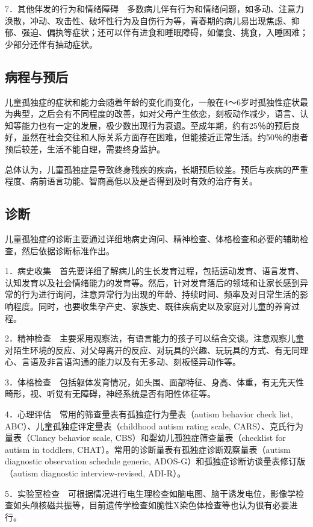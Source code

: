 7．其他伴发的行为和情绪障碍　多数病儿伴有行为和情绪问题，如多动、注意力涣散，冲动、攻击性、破坏性行为及自伤行为等，青春期的病儿易出现焦虑、抑郁、强迫、偏执等症状；还可以伴有进食和睡眠障碍，如偏食、挑食，入睡困难；少部分还伴有抽动症状。

\subsection{病程与预后}

儿童孤独症的症状和能力会随着年龄的变化而变化，一般在4～6岁时孤独性症状最为典型，之后会有不同程度的改善，如对父母产生依恋，刻板动作减少，语言、认知等能力也有一定的发展，极少数出现行为衰退。至成年期，约有25％的预后良好，虽然在社会交往和人际关系方面存在困难，但能接近正常生活。约50％的患者预后较差，生活不能自理，需要终身监护。

总体认为，儿童孤独症是导致终身残疾的疾病，长期预后较差。预后与疾病的严重程度、病前语言功能、智商高低以及是否得到及时有效的治疗有关。

\subsection{诊断}

儿童孤独症的诊断主要通过详细地病史询问、精神检查、体格检查和必要的辅助检查，然后依据诊断标准作出。

1．病史收集　首先要详细了解病儿的生长发育过程，包括运动发育、语言发育、认知发育以及社会情绪能力的发育等。然后，针对发育落后的领域和让家长感到异常的行为进行询问，注意异常行为出现的年龄、持续时间、频率及对日常生活的影响程度。同时，也要收集孕产史、家族史、既往疾病史以及家庭对儿童的养育过程。

2．精神检查　主要采用观察法，有语言能力的孩子可以结合交谈。注意观察儿童对陌生环境的反应、对父母离开的反应、对玩具的兴趣、玩玩具的方式、有无同理心、言语及非言语沟通的能力以及有无多动、刻板怪异动作等。

3．体格检查　包括躯体发育情况，如头围、面部特征、身高、体重，有无先天性畸形，视、听觉有无障碍，神经系统是否有阳性体征等。

4．心理评估　常用的筛查量表有孤独症行为量表（autism behavior check list,
ABC）、儿童孤独症评定量表（childhood autism rating scale,
CARS）、克氏行为量表（Clancy behavior scale,
CBS）和婴幼儿孤独症筛查量表（checklist for autism in toddlers,
CHAT）。常用的诊断量表有孤独症诊断观察量表（autism diagnostic
observation schedule generic, ADOS-G）和孤独症诊断访谈量表修订版（autism
diagnostic interview-revised, ADI-R）。

5．实验室检查　可根据情况进行电生理检查如脑电图、脑干诱发电位，影像学检查如头颅核磁共振等，目前遗传学检查如脆性X染色体检查等也认为很有必要进行。

